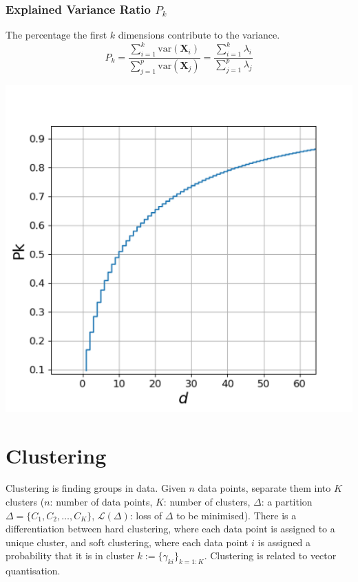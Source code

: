 \documentclass[11pt]{article}
\theoremstyle{definition}
\begin{document}
\subsubsection{Explained Variance Ratio $P_k$}
\begin{minipage}{0.55\linewidth}
	The percentage the first $k$ dimensions contribute to the variance.
	\begin{equation*}
	P_k = \frac{\sum_{i=1}^k \text{var}\left(\textbf{X}_i\right)}{\sum_{j=1}^p \text{var}\left(\textbf{X}_j\right)} = \frac{\sum_{i=1}^{k} \lambda_i}{\sum_{j=1}^{p} \lambda_j}
	\end{equation*}
\end{minipage}
\begin{minipage}{0.4\linewidth}
	\begin{center}
		\includegraphics[width=\linewidth]{img/explained_variance_ratio}
	\end{center}
\end{minipage}




\section{Clustering}
Clustering is finding groups in data. Given $n$ data points, separate them into $K$ clusters ($n$: number of data points, $K$: number of clusters, $\Delta$: a partition $\Delta = \{C_1, C_2,\dots, C_K\}$, $\mathcal{L}(\Delta)$: loss of $\Delta$ to be minimised). There is a differentiation between hard clustering, where each data point is assigned to a unique cluster, and soft clustering, where each data point $i$ is assigned a probability that it is in cluster $k:=\{\gamma_{ki}\}_{k=1:K}$. Clustering is related to vector quantisation.
\end{document}
